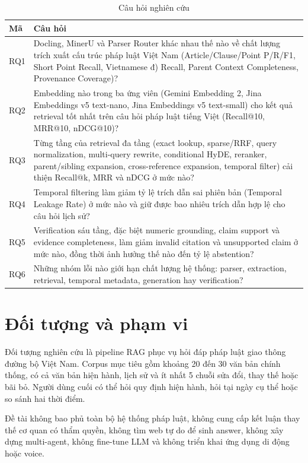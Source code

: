 \documentclass[a4paper,12pt]{extreport}
\begin{document}
\begin{table}[H]
\caption{Câu hỏi nghiên cứu}
\begin{tabularx}{\textwidth}{p{1.2cm}X}
\toprule
\textbf{Mã} & \textbf{Câu hỏi}\\
\midrule
RQ1 & Docling, MinerU và Parser Router khác nhau thế nào về chất lượng trích xuất cấu trúc pháp luật Việt Nam (Article/Clause/Point P/R/F1, Short Point Recall, Vietnamese đ) Recall, Parent Context Completeness, Provenance Coverage)?\\
RQ2 & Embedding nào trong ba ứng viên (Gemini Embedding 2, Jina Embeddings v5 text-nano, Jina Embeddings v5 text-small) cho kết quả retrieval tốt nhất trên câu hỏi pháp luật tiếng Việt (Recall@10, MRR@10, nDCG@10)?\\
RQ3 & Từng tầng của retrieval đa tầng (exact lookup, sparse/RRF, query normalization, multi-query rewrite, conditional HyDE, reranker, parent/sibling expansion, cross-reference expansion, temporal filter) cải thiện Recall@k, MRR và nDCG ở mức nào?\\
RQ4 & Temporal filtering làm giảm tỷ lệ trích dẫn sai phiên bản (Temporal Leakage Rate) ở mức nào và giữ được bao nhiêu trích dẫn hợp lệ cho câu hỏi lịch sử?\\
RQ5 & Verification sáu tầng, đặc biệt numeric grounding, claim support và evidence completeness, làm giảm invalid citation và unsupported claim ở mức nào, đồng thời ảnh hưởng thế nào đến tỷ lệ abstention?\\
RQ6 & Những nhóm lỗi nào giới hạn chất lượng hệ thống: parser, extraction, retrieval, temporal metadata, generation hay verification?\\
\bottomrule
\end{tabularx}
\end{table}

\section{Đối tượng và phạm vi}

Đối tượng nghiên cứu là pipeline RAG phục vụ hỏi đáp pháp luật giao thông đường bộ Việt Nam. Corpus mục tiêu gồm khoảng 20 đến 30 văn bản chính thống, có cả văn bản hiện hành, lịch sử và ít nhất 5 chuỗi sửa đổi, thay thế hoặc bãi bỏ. Người dùng cuối có thể hỏi quy định hiện hành, hỏi tại ngày cụ thể hoặc so sánh hai thời điểm.

Đề tài không bao phủ toàn bộ hệ thống pháp luật, không cung cấp kết luận thay thế cơ quan có thẩm quyền, không tìm web tự do để sinh answer, không xây dựng multi-agent, không fine-tune LLM và không triển khai ứng dụng di động hoặc voice.
\end{document}
